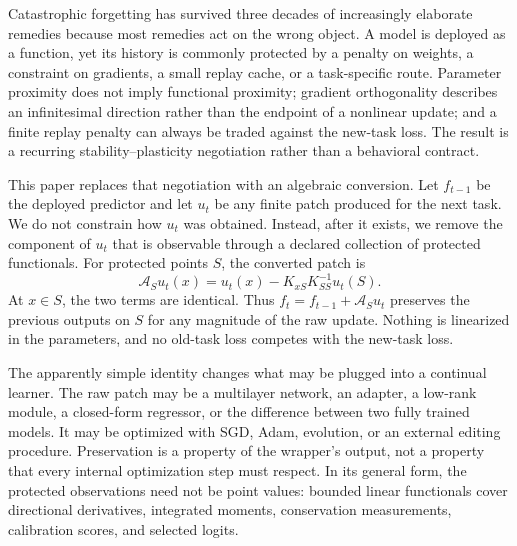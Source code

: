 \documentclass{vanish_ieee}
\theoremstyle{definition}
\newcommand{\Aop}{\mathcal{A}}
\begin{document}
Catastrophic forgetting has survived three decades of increasingly elaborate remedies because most remedies act on the wrong object.  A model is deployed as a function, yet its history is commonly protected by a penalty on weights, a constraint on gradients, a small replay cache, or a task-specific route.  Parameter proximity does not imply functional proximity; gradient orthogonality describes an infinitesimal direction rather than the endpoint of a nonlinear update; and a finite replay penalty can always be traded against the new-task loss.  The result is a recurring stability--plasticity negotiation rather than a behavioral contract.

This paper replaces that negotiation with an algebraic conversion.  Let $f_{t-1}$ be the deployed predictor and let $u_t$ be any finite patch produced for the next task.  We do not constrain how $u_t$ was obtained.  Instead, after it exists, we remove the component of $u_t$ that is observable through a declared collection of protected functionals.  For protected points $S$, the converted patch is
\begin{equation}
\Aop_S u_t(x)=u_t(x)-K_{xS}K_{SS}^{-1}u_t(S).
\label{eq:anchor-operator}
\end{equation}
At $x\in S$, the two terms are identical.  Thus $f_t=f_{t-1}+\Aop_Su_t$ preserves the previous outputs on $S$ for any magnitude of the raw update.  Nothing is linearized in the parameters, and no old-task loss competes with the new-task loss.

The apparently simple identity changes what may be plugged into a continual learner.  The raw patch may be a multilayer network, an adapter, a low-rank module, a closed-form regressor, or the difference between two fully trained models.  It may be optimized with SGD, Adam, evolution, or an external editing procedure.  Preservation is a property of the wrapper's output, not a property that every internal optimization step must respect.  In its general form, the protected observations need not be point values: bounded linear functionals cover directional derivatives, integrated moments, conservation measurements, calibration scores, and selected logits.
\end{document}
